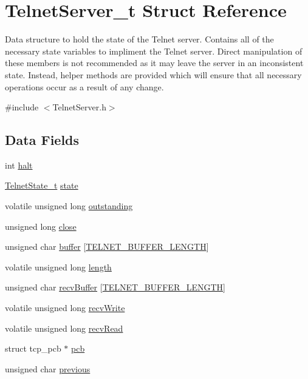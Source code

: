 \hypertarget{struct_telnet_server__t}{\section{Telnet\-Server\-\_\-t Struct Reference}
\label{struct_telnet_server__t}
}


Data structure to hold the state of the Telnet server. Contains all of the necessary state variables to impliment the Telnet server. Direct manipulation of these members is not recommended as it may leave the server in an inconsistent state. Instead, helper methods are provided which will ensure that all necessary operations occur as a result of any change.  




{\ttfamily \#include $<$Telnet\-Server.\-h$>$}

\subsection*{Data Fields}
\begin{DoxyCompactItemize}
\item 
int \hyperlink{struct_telnet_server__t_a9a80d626b495810428f2f14b4dae6ecb}{halt}
\item 
\hyperlink{group__telnet__server_ga6a34decdb77d8c9df8ead5420ea8d326}{Telnet\-State\-\_\-t} \hyperlink{struct_telnet_server__t_a8010cffb8a33a3f5d540dcd6ef57a7b6}{state}
\item 
volatile unsigned long \hyperlink{struct_telnet_server__t_ad311f0113656983251afddd4b62e758e}{outstanding}
\item 
unsigned long \hyperlink{struct_telnet_server__t_a65bcef02b557e4aa1e0f04cc2ae743b9}{close}
\item 
unsigned char \hyperlink{struct_telnet_server__t_a2153306d0b7676b5fbe604eb2d5d8dd9}{buffer} \mbox{[}\hyperlink{group__telnet__server_gae9088b6c383afeff8d58098f141afbd3}{T\-E\-L\-N\-E\-T\-\_\-\-B\-U\-F\-F\-E\-R\-\_\-\-L\-E\-N\-G\-T\-H}\mbox{]}
\item 
volatile unsigned long \hyperlink{struct_telnet_server__t_a41a73345f82ef7f47757b13967fcc815}{length}
\item 
unsigned char \hyperlink{struct_telnet_server__t_a22aa9df37278d5baef90c6738214d9a1}{recv\-Buffer} \mbox{[}\hyperlink{group__telnet__server_gae9088b6c383afeff8d58098f141afbd3}{T\-E\-L\-N\-E\-T\-\_\-\-B\-U\-F\-F\-E\-R\-\_\-\-L\-E\-N\-G\-T\-H}\mbox{]}
\item 
volatile unsigned long \hyperlink{struct_telnet_server__t_ac07efa3d17c62c9b958f4324b78ebf55}{recv\-Write}
\item 
volatile unsigned long \hyperlink{struct_telnet_server__t_a4b9f32d419aaecd74a928bb8286f2a7b}{recv\-Read}
\item 
struct tcp\-\_\-pcb $\ast$ \hyperlink{struct_telnet_server__t_a7d8c5f5eed3154f7848c3a2ac9a9863a}{pcb}
\item 
unsigned char \hyperlink{struct_telnet_server__t_a8616416f9e7e002fe8f0a98f0ed71fd5}{previous}
\end{DoxyCompactItemize}


